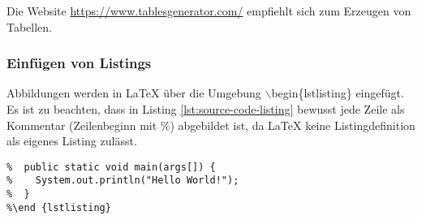 Die Website \url{https://www.tablesgenerator.com/} empfiehlt sich zum Erzeugen von Tabellen.

\subsubsection{Einfügen von Listings}
Abbildungen werden in \LaTeX{} über die Umgebung $\backslash$begin\{lstlisting\} eingefügt. Es ist zu beachten, dass in Listing \ref{lst:source-code-listing} bewusst jede Zeile als Kommentar (Zeilenbeginn mit \%) abgebildet ist, da \LaTeX{} keine Listingdefinition als eigenes Listing zulässt.

\begin{lstlisting}[caption={Quelltext für ein Listing},label=lst:source-code-listing]
%\begin{lstlisting}
%  public static void main(args[]) {
%    System.out.println("Hello World!");  
%  }
%\end {lstlisting}
\end{lstlisting}
